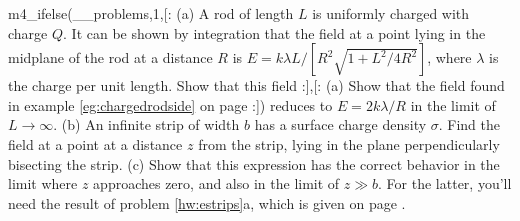         m4_ifelse(__problems,1,[:%
          (a) A rod of length $L$ is uniformly charged with charge $Q$.
          It can be shown by integration that the field at a point lying in the midplane of the rod
          at a distance $R$ is  $E =  k\lambda L/\left[R^2\sqrt{1+ L^2/4 R^2}\right]$, where $\lambda$
          is the charge per unit length. Show that this field
        :],[:%
          (a) Show that the field found in example \ref{eg:chargedrodside} on page \pageref{eg:chargedrodside}
        :])%
        reduces to $E=2k\lambda/R$ in the limit of $L\rightarrow\infty$.\hwendpart
        (b) An infinite strip of width $b$ has a surface charge density $\sigma$.
        Find the field at a point at a distance $z$ from the strip,
        lying in the plane perpendicularly bisecting the strip.
        \answercheck\hwendpart
        (c) Show that this expression has the
        correct behavior in the limit where $z$ approaches zero,
        and also in the limit of $z\gg b$. For the latter, you'll need
        the result of problem \ref{hw:estrips}a, which is given
        on page \pageref{hwans:estrips}.
